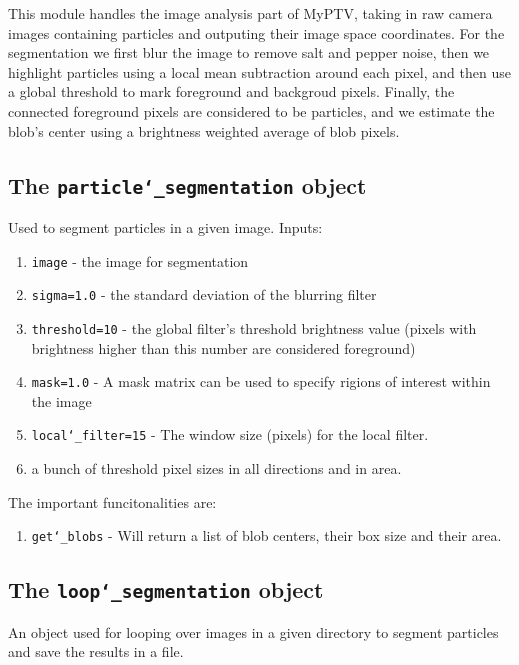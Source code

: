 \documentclass[10pt,a4paper]{article}
\begin{document}
This module handles the image analysis part of MyPTV, taking in raw camera images containing particles and outputing their image space coordinates. For the segmentation we first blur the image to remove salt and pepper noise, then we highlight particles using a local mean subtraction around each pixel, and then use a global threshold to mark foreground and backgroud pixels. Finally, the connected foreground pixels are considered to be particles, and we estimate the blob's center using a brightness weighted average of blob pixels.



\subsection{The \texttt{particle\char`_segmentation} object} 

Used to segment particles in a given image. Inputs:
%
\begin{enumerate}
	\item \texttt{image} - the image for segmentation
	\item \texttt{sigma=1.0} - the standard deviation of the blurring filter
	\item \texttt{threshold=10} - the global filter's threshold brightness value (pixels with brightness higher than this number are considered foreground) 
	\item \texttt{mask=1.0} - A mask matrix can be used to specify rigions of interest within the image
	\item \texttt{local\char`_filter=15} - The window size (pixels) for the local filter.
	\item a bunch of threshold pixel sizes in all directions and in area.
\end{enumerate}


The important funcitonalities are:
%
\begin{enumerate}
	\item \texttt{get\char`_blobs} - Will return a list of blob centers, their box size and their area.
\end{enumerate}






\subsection{The \texttt{loop\char`_segmentation} object} 


An object used for looping over images in a given directory to segment particles
and save the results in a file.
\end{document}
